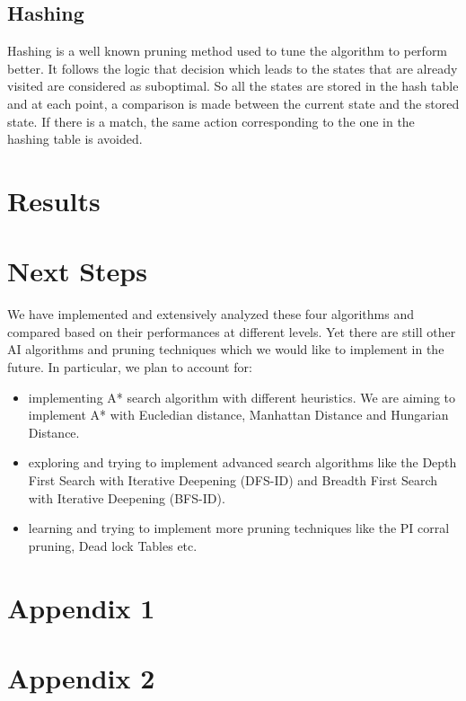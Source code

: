 \documentclass[10pt, final]{article}
\begin{document}
\subsection{Hashing}
Hashing is a well known pruning method used to tune the algorithm to perform better. It follows the logic that decision which leads to the states that are already visited are considered as suboptimal. So all the states are stored in the hash table and at each point, a comparison is made between the current state and the stored state. If there is a match, the same action corresponding to the one in the hashing table is avoided.
\section{Results}
\section{Next Steps}
We have implemented and extensively analyzed these four algorithms and compared based on their performances at different levels. Yet there are still other AI algorithms and pruning techniques which we would like to implement in the future. In particular, we plan to account for:
\begin{itemize}
\item implementing A* search algorithm with different heuristics. We are aiming to implement A* with Eucledian distance, Manhattan Distance and Hungarian Distance.
\item exploring and trying to implement advanced search algorithms like the Depth First Search with Iterative Deepening (DFS-ID) and Breadth First Search with Iterative Deepening (BFS-ID).
\item learning and trying to implement more pruning techniques like the PI corral pruning, Dead lock Tables etc.
\end{itemize}

\newpage

\section{Appendix 1}


\newpage

\section{Appendix 2}
\end{document}
